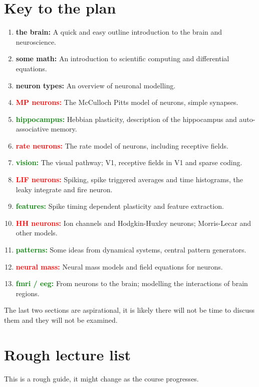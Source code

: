 \documentclass[11pt,a4paper]{scrartcl}
\begin{document}
\section*{Key to the plan}


\begin{enumerate}[label=(\alph*)]
\item \textbf{the brain:} A quick and easy outline introduction to the brain and neuroscience.
\item \textbf{some math:} An introduction to scientific computing and differential equations.
\item \textbf{neuron types:} An overview of neuronal modelling.
\item \textbf{\textcolor{red}{MP neurons:}} The McCulloch Pitts model of neurons, simple synapses.
\item \textbf{\textcolor{green}{hippocampus:}} Hebbian plasticity, description of the hippocampus and auto-associative memory.
\item \textbf{\textcolor{red}{rate neurons:}} The rate model of neurons, including
  receptive fields.
\item \textbf{\textcolor{green}{vision:}} The visual pathway; V1, receptive fields in V1 and sparse coding.
\item \textbf{\textcolor{red}{LIF neurons:}} Spiking, spike triggered averages and time histograms, the leaky integrate and fire neuron.
\item \textbf{\textcolor{green}{features:}} Spike timing dependent plasticity and feature extraction.
\item \textbf{\textcolor{red}{HH neurons:}} Ion channels and Hodgkin-Huxley neurons;
  Morris-Lecar and other models.
\item \textbf{\textcolor{green}{patterns:}} Some ideas from dynamical systems, central pattern generators.
\item \textbf{\textcolor{red}{neural mass:}} Neural mass models and field equations for neurons.
\item \textbf{\textcolor{green}{fmri / eeg:}} From neurons to the brain; modelling the interactions of brain regions.
\end{enumerate}

The last two sections are aspirational, it is likely there will not be time to discuss them and they will not be examined.

\section*{Rough lecture list}
This is a rough guide, it might change as the course progresses.
\end{document}

